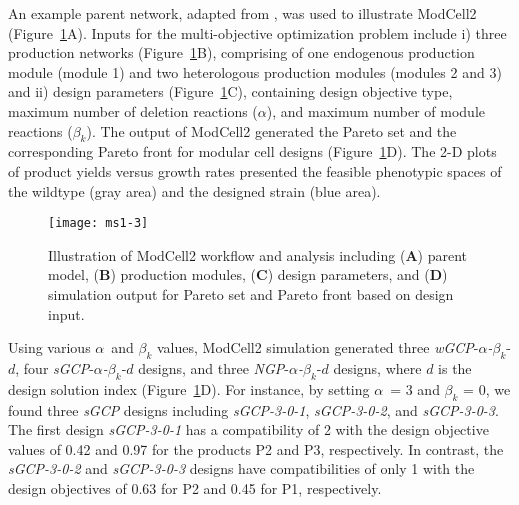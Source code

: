 An example parent network, adapted from \citep{trinh2015}, was used to illustrate ModCell2 (Figure~\ref{fig:ms1-fig3}A).
Inputs for the multi-objective optimization problem include i) three production networks (Figure~\ref{fig:ms1-fig3}B), comprising of one endogenous production module (module 1) and two heterologous production modules (modules 2 and 3) and ii) design parameters (Figure~\ref{fig:ms1-fig3}C), containing design objective type, maximum number of deletion reactions (\(\alpha\)), and maximum number of module reactions (\(\beta_{k}\)).
The output of ModCell2 generated the Pareto set and the corresponding Pareto front for modular cell designs (Figure~\ref{fig:ms1-fig3}D).
The 2-D plots of product yields versus growth rates presented the feasible phenotypic spaces of the wildtype (gray area) and the designed strain (blue area).

\begin{figure}[p]
  \centering
  \texttt{[image: ms1-3]}
    \caption[ModCell2 workflow and analysis]{
Illustration of ModCell2 workflow and analysis
including (\textbf{A}) parent model, (\textbf{B}) production modules,
(\textbf{C}) design parameters, and (\textbf{D}) simulation output for
Pareto set and Pareto front based on design input.
    }
    \label{fig:ms1-fig3}
\end{figure}

Using various \(\alpha\)~and \(\beta_{k}\) values, ModCell2 simulation generated three \emph{wGCP}-\(\alpha\)\emph{-}\(\beta_{k}\)-\(d\), four \emph{sGCP}-\(\alpha\)\emph{-}\(\beta_{k}\)-\(d\) designs, and three \emph{NGP}-\(\alpha\)\emph{-}\(\beta_{k}\)-\(d\) designs, where \(d\) is the design solution index (Figure~\ref{fig:ms1-fig3}D).
For instance, by setting \(\alpha\)~= 3 and \(\beta_{k}\) = 0, we found three \emph{sGCP} designs including \emph{sGCP-3-0-1}, \emph{sGCP-3-0-2}, and \emph{sGCP-3-0-3}.
The first design \emph{sGCP-3-0-1} has a compatibility of 2 with the design objective values of 0.42 and 0.97 for the products P2 and P3, respectively.
In contrast, the \emph{sGCP-3-0-2} and \emph{sGCP-3-0-3} designs have compatibilities of only 1 with the design objectives of 0.63 for P2 and 0.45 for P1, respectively.

